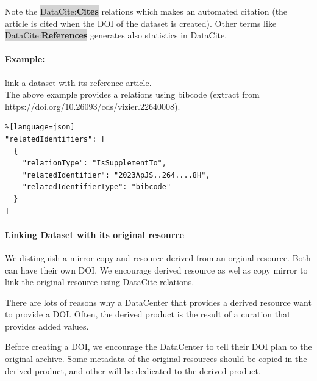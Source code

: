 \documentclass[11pt,a4paper]{ivoa}
\newcommand{\dataciteterm}[1]{\colorbox{lightgray}{DataCite:\textbf{#1}}}
\begin{document}
Note the \dataciteterm{Cites} relations which makes an automated citation (the article is cited when the DOI of the dataset is created). 
Other terms like \dataciteterm{References} generates also statistics in DataCite.





\paragraph{Example:} link a dataset with its reference article.\\
The above example provides a relations using bibcode (extract from \url{https://doi.org/10.26093/cds/vizier.22640008}).

\begin{lstlisting}%[language=json]
"relatedIdentifiers": [
  {
    "relationType": "IsSupplementTo",
    "relatedIdentifier": "2023ApJS..264....8H",
    "relatedIdentifierType": "bibcode"
  }
]
\end{lstlisting}

\paragraph{Linking Dataset with its original resource}
We distinguish a mirror copy and resource derived from an orginal resource.
Both can have their own DOI. We encourage derived resource as wel as copy mirror to link the original resource using DataCite relations.

There are lots of reasons why a DataCenter that provides a derived resource want to provide a DOI. 
Often, the derived product is the result of a curation that provides added values.

Before creating a DOI, we encourage the DataCenter to tell their DOI plan to the original archive.
Some metadata of the original resources should be copied in the derived product, and other will be dedicated to the derived product.
\end{document}
